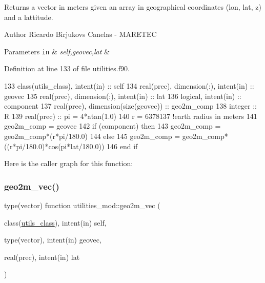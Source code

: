 Returns a vector in meters given an array in geographical coordinates (lon, lat, z) and a lattitude. 

\begin{DoxyAuthor}{Author}
Ricardo Birjukovs Canelas -\/ M\+A\+R\+E\+T\+EC 
\end{DoxyAuthor}

\begin{DoxyParams}[1]{Parameters}
\mbox{\tt in}  & {\em self,geovec,lat} & \\
\hline
\end{DoxyParams}


Definition at line 133 of file utilities.\+f90.


\begin{DoxyCode}
133     \textcolor{keywordtype}{class}(utils\_class), \textcolor{keywordtype}{intent(in)} :: self
134     \textcolor{keywordtype}{real(prec)}, \textcolor{keywordtype}{dimension(:)}, \textcolor{keywordtype}{intent(in)} :: geovec
135     \textcolor{keywordtype}{real(prec)}, \textcolor{keywordtype}{dimension(:)}, \textcolor{keywordtype}{intent(in)} :: lat
136     \textcolor{keywordtype}{logical}, \textcolor{keywordtype}{intent(in)} :: component
137     \textcolor{keywordtype}{real(prec)}, \textcolor{keywordtype}{dimension(size(geovec))} :: geo2m\_comp
138     \textcolor{keywordtype}{integer} :: R
139     \textcolor{keywordtype}{real(prec)} :: pi = 4*atan(1.0)
140     r = 6378137 \textcolor{comment}{!earth radius in meters    }
141     geo2m\_comp = geovec
142     \textcolor{keywordflow}{if} (component) \textcolor{keywordflow}{then}
143         geo2m\_comp = geo2m\_comp*(r*pi/180.0)
144     \textcolor{keywordflow}{else}
145         geo2m\_comp = geo2m\_comp*((r*pi/180.0)*cos(pi*lat/180.0))
146 \textcolor{keywordflow}{    end if}
\end{DoxyCode}
Here is the caller graph for this function\+:
\mbox{\label{namespaceutilities__mod_a3d3d0e1568b178cd3e0bb8013642946c}} 
\subsubsection{\texorpdfstring{geo2m\+\_\+vec()}{geo2m\_vec()}}
{\footnotesize\ttfamily type(vector) function utilities\+\_\+mod\+::geo2m\+\_\+vec (\begin{DoxyParamCaption}\item[{class(\mbox{\hyperlink{structutilities__mod_1_1utils__class}{utils\+\_\+class}}), intent(in)}]{self,  }\item[{type(vector), intent(in)}]{geovec,  }\item[{real(prec), intent(in)}]{lat }\end{DoxyParamCaption})\hspace{0.3cm}{\ttfamily [private]}}



